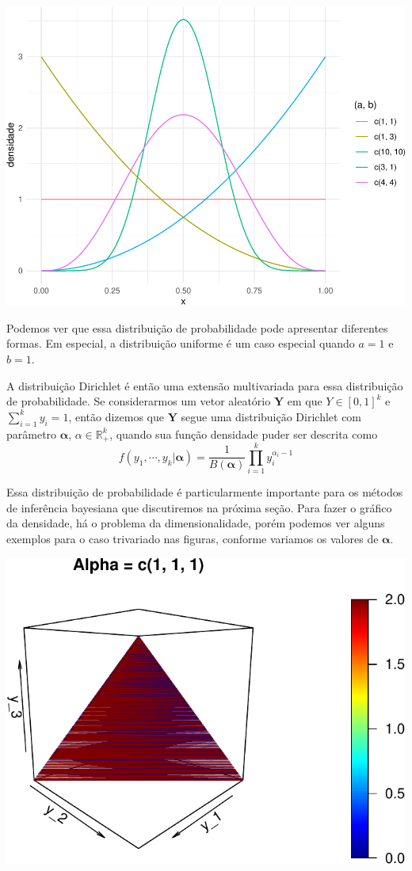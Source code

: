 \documentclass[]{book}
\begin{document}
\begin{center}\includegraphics[width=0.8\linewidth]{notas_livro_files/figure-latex/graf14-1} \end{center}

Podemos ver que essa distribuição de probabilidade pode apresentar diferentes formas. Em especial, a distribuição uniforme é um caso especial quando \(a = 1\) e \(b = 1\).

A distribuição Dirichlet é então uma extensão multivariada para essa distribuição de probabilidade. Se considerarmos um vetor aleatório \(\boldsymbol Y\) em que \(Y \in [0, 1]^k\) e \(\sum_{i=1}^k y_i = 1\), então dizemos que \(\boldsymbol Y\) segue uma distribuição Dirichlet com parâmetro \(\boldsymbol \alpha\), \(\alpha \in \mathbb{R}_+^k\), quando sua função densidade puder ser descrita como
\[
f(y_1, \cdots, y_k | \boldsymbol \alpha) = \frac{1}{B(\boldsymbol \alpha)} 
\prod_{i=1}^k y_i^{\alpha_i - 1}
\]

Essa distribuição de probabilidade é particularmente importante para os métodos de inferência bayesiana que discutiremos na próxima seção. Para fazer o gráfico da densidade, há o problema da dimensionalidade, porém podemos ver alguns exemplos para o caso trivariado nas figuras, conforme variamos os valores de \(\boldsymbol \alpha\).

\begin{center}\includegraphics[width=0.8\linewidth]{notas_livro_files/figure-latex/graf15-1} \end{center}
\end{document}
